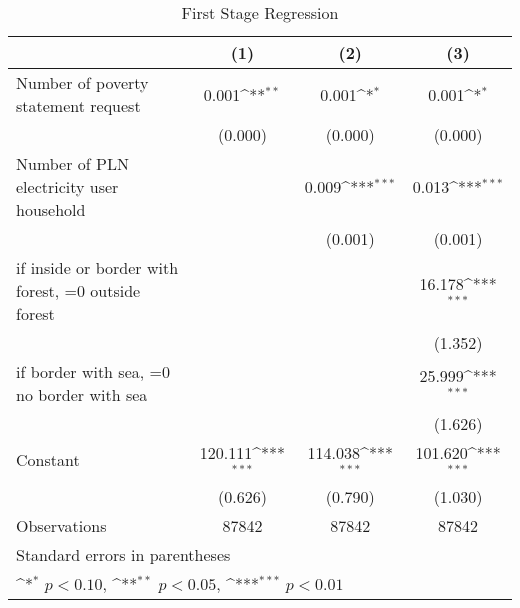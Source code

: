 \begin{table}[htbp]\centering
\def\sym#1{\ifmmode^{#1}\else\(^{#1}\)\fi}
\caption{First Stage Regression}
\begin{tabular}{l*{3}{c}}
\toprule
                    &\multicolumn{1}{c}{(1)}         &\multicolumn{1}{c}{(2)}         &\multicolumn{1}{c}{(3)}         \\
\midrule
Number of poverty statement request&       0.001\sym{**} &       0.001\sym{*}  &       0.001\sym{*}  \\
                    &     (0.000)         &     (0.000)         &     (0.000)         \\
\addlinespace
Number of PLN electricity user household&                     &       0.009\sym{***}&       0.013\sym{***}\\
                    &                     &     (0.001)         &     (0.001)         \\
\addlinespace
=1 if inside or border with forest, =0 outside forest&                     &                     &      16.178\sym{***}\\
                    &                     &                     &     (1.352)         \\
\addlinespace
=1 if border with sea, =0 no border with sea&                     &                     &      25.999\sym{***}\\
                    &                     &                     &     (1.626)         \\
\addlinespace
Constant            &     120.111\sym{***}&     114.038\sym{***}&     101.620\sym{***}\\
                    &     (0.626)         &     (0.790)         &     (1.030)         \\
\midrule
Observations        &       87842         &       87842         &       87842         \\
\bottomrule
\multicolumn{4}{l}{\footnotesize Standard errors in parentheses}\\
\multicolumn{4}{l}{\footnotesize \sym{*} \(p<0.10\), \sym{**} \(p<0.05\), \sym{***} \(p<0.01\)}\\
\end{tabular}
\end{table}
